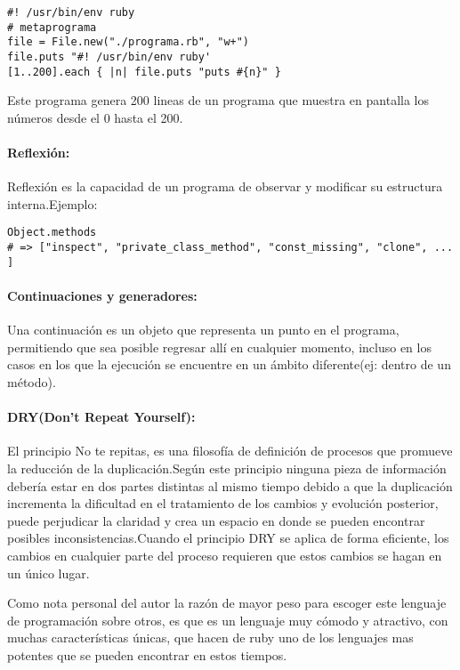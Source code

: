 \begin{verbatim}
#! /usr/bin/env ruby
# metaprograma
file = File.new("./programa.rb", "w+")
file.puts "#! /usr/bin/env ruby'
[1..200].each { |n| file.puts "puts #{n}" }
\end{verbatim}

Este programa genera 200 lineas de un programa que muestra en pantalla los números desde el 0 hasta el 200.

\paragraph{Reflexión:}
Reflexión es la capacidad de un programa de observar y modificar su estructura interna.\newline Ejemplo:

\begin{verbatim}
Object.methods
# => ["inspect", "private_class_method", "const_missing", "clone", ... ]
\end{verbatim}

\paragraph{Continuaciones y generadores:}
Una continuación es un objeto que representa un punto en el programa, permitiendo que sea posible regresar allí en cualquier momento, incluso en los casos en los que la ejecución se encuentre en un ámbito diferente(ej: dentro de un método).

\paragraph{DRY(Don't Repeat Yourself):}
El principio No te repitas, es una filosofía de definición de procesos que promueve la reducción de la duplicación.\newline Según este principio ninguna pieza de información debería estar en dos partes distintas al mismo tiempo debido a que la duplicación incrementa la dificultad en el tratamiento de los cambios y evolución posterior, puede perjudicar la claridad y crea un espacio en donde se pueden encontrar posibles inconsistencias.\newline Cuando el principio DRY se aplica de forma eficiente, los cambios en cualquier parte del proceso requieren que estos cambios se hagan en un único lugar.

Como nota personal del autor la razón de mayor peso para escoger este lenguaje de programación sobre otros, es que es un lenguaje muy cómodo y atractivo, con muchas características únicas, que hacen de ruby uno de los lenguajes mas potentes que se pueden encontrar en estos tiempos.


